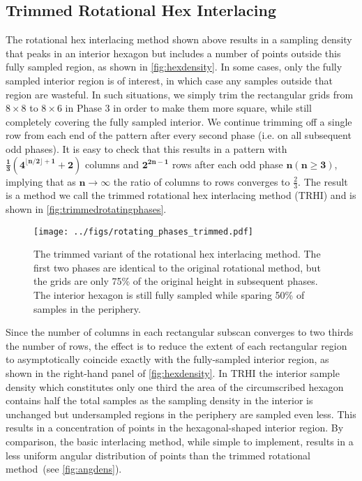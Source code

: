 \documentclass[aip, amsmath, amssymb, nobibnotes, nofootinbib, citeautoscript, reprint, superscriptaddress]{revtex4-1}
\begin{document}
    \subsection{\label{ssec:trimmed}Trimmed Rotational Hex Interlacing}

    The rotational hex interlacing method shown above results in a sampling density that peaks in an interior hexagon but includes a number of points outside this fully sampled region, as shown in \autoref{fig:hexdensity}.
    In some cases, only the fully sampled interior region is of interest, in which case any samples outside that region are wasteful.
    In such situations, we simply trim the rectangular grids from $\mathrm{8\times 8}$ to $\mathrm{8\times 6}$ in
    Phase 3 in order to make them more square, while still completely covering the fully sampled interior.
    We continue trimming off a single row from each end of the pattern after every second phase (i.e. on all subsequent odd phases).
    It is easy to check that this results in a pattern with $\mathbf{\frac{1}{3}\left(4^{\lfloor n/2\rfloor + 1} + 2\right)}$ columns and $\mathbf{2^{2n - 1}}$ rows after each odd phase $\mathbf{n \left(n\ge 3\right)}$, implying that as $\mathbf{n\to\infty}$ the
    ratio of columns to rows converges to $\mathrm{\frac{2}{3}}$.
    The result is a method we call the trimmed rotational hex interlacing method (TRHI) and is shown in \autoref{fig:trimmedrotatingphases}.


    \begin{figure*}
        \centering
        \texttt{[image: ../figs/rotating\_phases\_trimmed.pdf]}
        \caption{
        \label{fig:trimmedrotatingphases} 
        The trimmed variant of the rotational hex interlacing method.
        The first two phases are identical to the original rotational method, but the grids are only 75\% of the original height in subsequent phases.
        The interior hexagon is still fully sampled while sparing 50\% of samples in the periphery.
        }
    \end{figure*}


    Since the number of columns in each rectangular subscan converges to two thirds the number of rows, the effect is to reduce the extent of each rectangular region to asymptotically coincide exactly with the fully-sampled interior region, as shown in the right-hand panel of \autoref{fig:hexdensity}.
    In TRHI the interior sample density which constitutes only one third the area of the circumscribed hexagon contains half the total samples as the sampling density in the interior is unchanged but undersampled regions in the periphery are sampled even less.
    This results in a concentration of points in the hexagonal-shaped interior region.
    By comparison, the basic interlacing method, while simple to implement, results in a less uniform angular distribution of points than the trimmed rotational method~(see \autoref{fig:angdens}).
\end{document}
